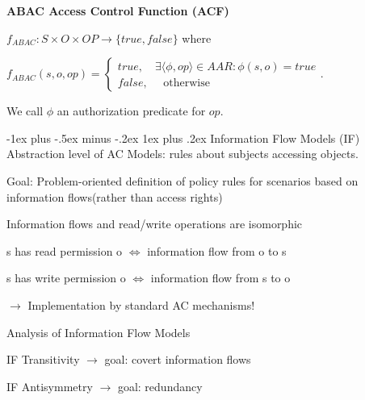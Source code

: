 \documentclass[a4paper]{article}
\makeatletter
\renewcommand{\note}[2]{\begin{noteBox} \textbf{#1} #2 \end{noteBox}}
\renewcommand{\subsubsection}{\@startsection{subsubsection}{3}{0mm}%
                {-1ex plus -.5ex minus -.2ex}%
                {1ex plus .2ex}%
                {\normalfont\small\bfseries}}
\makeatother
\begin{document}
\begin{multicols}{3}
    \note{ABAC Access Control Function (ACF)}{
        \begin{itemize*}
            \item $f_{ABAC}:S\times O\times OP\rightarrow\{true,false\}$ where
            \item $f_{ABAC}(s,o,op)= \begin{cases} true, \quad\exists \langle \phi,op\rangle \in AAR:\phi(s,o)=true\\ false, \quad\text{ otherwise } \end{cases}$.
            \item We call $\phi$ an authorization predicate for $op$.
        \end{itemize*}
    }

    \subsubsection{Information Flow Models (IF)}
    Abstraction level of AC Models: rules about subjects accessing objects.

    Goal: Problem-oriented definition of policy rules for scenarios based on information flows(rather than access rights)
    \begin{itemize*}
        \item Information flows and read/write operations are isomorphic
        \begin{itemize*}
            \item s has read permission o $\Leftrightarrow$ information flow from o to s
            \item s has write permission o $\Leftrightarrow$ information flow from s to o
        \end{itemize*}
        \item[$\rightarrow$] Implementation by standard AC mechanisms!
    \end{itemize*}

    Analysis of Information Flow Models
    \begin{itemize*}
        \item IF Transitivity $\rightarrow$ goal: covert information flows
        \item IF Antisymmetry $\rightarrow$ goal: redundancy
    \end{itemize*}


\end{multicols}
\end{document}
